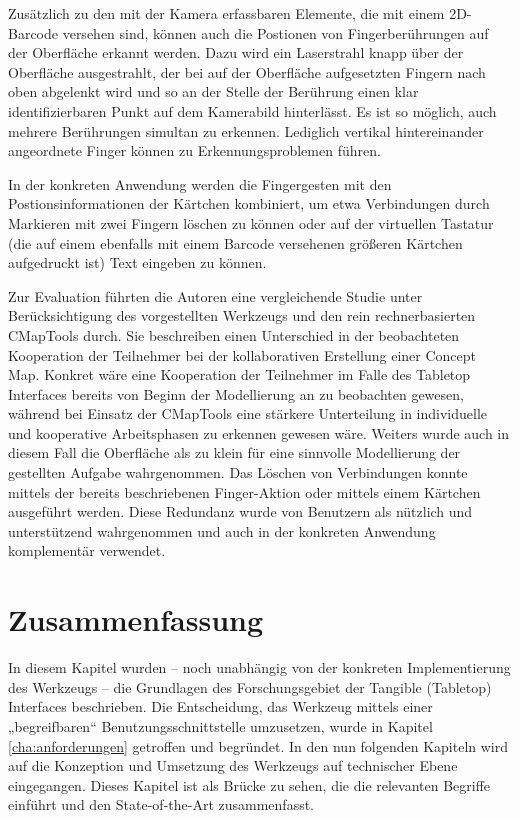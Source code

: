 Zusätzlich zu den mit der Kamera erfassbaren Elemente, die mit einem 2D-Barcode versehen sind, können auch die Postionen von Fingerberührungen auf der Oberfläche erkannt werden. Dazu wird ein Laserstrahl knapp über der Oberfläche ausgestrahlt, der bei auf der Oberfläche aufgesetzten Fingern nach oben abgelenkt wird und so an der Stelle der Berührung einen klar identifizierbaren Punkt auf dem Kamerabild hinterlässt. Es ist so möglich, auch mehrere Berührungen simultan zu erkennen. Lediglich vertikal hintereinander angeordnete Finger können zu Erkennungsproblemen führen.

In der konkreten Anwendung werden die Fingergesten mit den Postionsinformationen der Kärtchen kombiniert, um etwa Verbindungen durch Markieren mit zwei Fingern löschen zu können oder auf der virtuellen Tastatur (die auf einem ebenfalls mit einem Barcode versehenen größeren Kärtchen aufgedruckt ist) Text eingeben zu können.

Zur Evaluation führten die Autoren eine vergleichende Studie unter Berücksichtigung des vorgestellten Werkzeugs und den rein rechnerbasierten CMapTools \citep{Canas04} durch. Sie beschreiben einen Unterschied in der beobachteten Kooperation der Teilnehmer bei der kollaborativen Erstellung einer Concept Map. Konkret wäre eine Kooperation der Teilnehmer im Falle des Tabletop Interfaces bereits von Beginn der Modellierung an zu beobachten gewesen, während bei Einsatz der CMapTools eine stärkere Unterteilung in individuelle und kooperative Arbeitsphasen zu erkennen gewesen wäre. Weiters wurde auch in diesem Fall die Oberfläche als zu klein für eine sinnvolle Modellierung der gestellten Aufgabe wahrgenommen. Das Löschen von Verbindungen konnte mittels der bereits beschriebenen Finger-Aktion oder mittels einem Kärtchen ausgeführt werden. Diese Redundanz wurde von Benutzern als nützlich und unterstützend wahrgenommen und auch in der konkreten Anwendung komplementär verwendet.





\section{Zusammenfassung} %
\label{sec:impl_ueberblick_fazit}

In diesem Kapitel wurden -- noch unabhängig von der konkreten Implementierung des Werkzeugs -- die Grundlagen des Forschungsgebiet der Tangible (Tabletop) Interfaces beschrieben. Die Entscheidung, das Werkzeug mittels einer „begreifbaren“ Benutzungsschnittstelle umzusetzen, wurde in Kapitel \ref{cha:anforderungen} getroffen und begründet. In den nun folgenden Kapiteln wird auf die Konzeption und Umsetzung des Werkzeugs auf technischer Ebene eingegangen. Dieses Kapitel ist als Brücke zu sehen, die die relevanten Begriffe einführt und den State-of-the-Art zusammenfasst.

